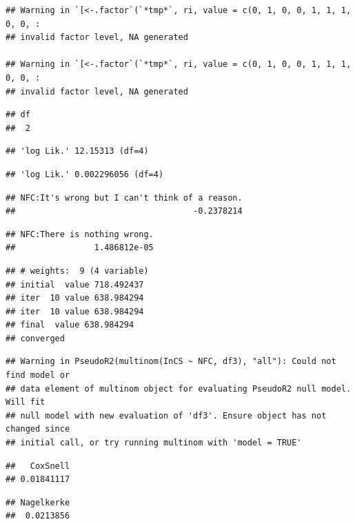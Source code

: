 \documentclass[
  american,
  man,floatsintext]{apa7}
\begin{document}
\begin{verbatim}
## Warning in `[<-.factor`(`*tmp*`, ri, value = c(0, 1, 0, 0, 1, 1, 1, 0, 0, :
## invalid factor level, NA generated

## Warning in `[<-.factor`(`*tmp*`, ri, value = c(0, 1, 0, 0, 1, 1, 1, 0, 0, :
## invalid factor level, NA generated
\end{verbatim}

\begin{verbatim}
## df 
##  2
\end{verbatim}

\begin{verbatim}
## 'log Lik.' 12.15313 (df=4)
\end{verbatim}

\begin{verbatim}
## 'log Lik.' 0.002296056 (df=4)
\end{verbatim}

\begin{verbatim}
## NFC:It's wrong but I can't think of a reason. 
##                                    -0.2378214
\end{verbatim}

\begin{verbatim}
## NFC:There is nothing wrong. 
##                1.486812e-05
\end{verbatim}

\begin{verbatim}
## # weights:  9 (4 variable)
## initial  value 718.492437 
## iter  10 value 638.984294
## iter  10 value 638.984294
## final  value 638.984294 
## converged
\end{verbatim}

\begin{verbatim}
## Warning in PseudoR2(multinom(InCS ~ NFC, df3), "all"): Could not find model or
## data element of multinom object for evaluating PseudoR2 null model. Will fit
## null model with new evaluation of 'df3'. Ensure object has not changed since
## initial call, or try running multinom with 'model = TRUE'
\end{verbatim}

\begin{verbatim}
##   CoxSnell 
## 0.01841117
\end{verbatim}

\begin{verbatim}
## Nagelkerke 
##  0.0213856
\end{verbatim}
\end{document}
